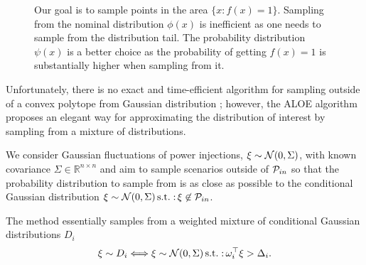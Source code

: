 \documentclass{IEEEtran4PSCC}
\DeclareMathOperator*{\st}{s.t.:}
\newcommand{\cP}{{\cal P}}
\newcommand{\cN}{{\cal N}}
\begin{document}
\begin{figure}[ht]
  \centering
\caption{
  Our goal is to sample points in the area $\{x: f(x) = 1\}$. Sampling from the nominal distribution $\phi(x)$ is inefficient as one needs to sample from the distribution tail. The probability distribution $\psi(x)$ is a better choice as the probability of getting $f(x) = 1$ is substantially higher when sampling from it.}
  \vspace{-5mm}
  \label{fig:20}
\end{figure}

Unfortunately, there is no exact and time-efficient algorithm for sampling outside of a convex polytope from Gaussian distribution \cite{khachiyan1993complexity}; however, the ALOE algorithm~\cite{owen2019importance,lukashevich2021power} proposes an elegant way for approximating the distribution of interest by sampling from a mixture of distributions. 

We consider Gaussian fluctuations of power injections, $\xi \sim \cN(0, \Sigma)$, with known covariance $\Sigma \in \mathbb{R}^{n\times n}$ and aim to sample scenarios outside of $\cP_{in}$ so that the probability distribution to sample from is as close as possible to the conditional Gaussian distribution $\xi \sim \cN(0, \Sigma) \st \xi\not\in \cP_{in}$. 

The method essentially samples from a weighted mixture of conditional Gaussian distributions $D_i$ 
\[\xi \sim D_i \Longleftrightarrow \xi \sim \cN(0, \Sigma) \st \omega_i^\top \xi > \Delta_i. \]
\end{document}

